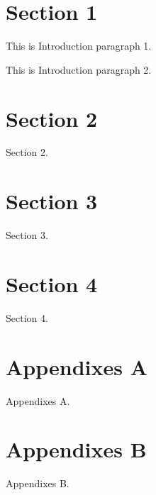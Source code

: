 \documentclass[%
 reprint,
 amsmath,amssymb,
 aps,
]{revtex4-2}
\begin{document}

\section{Section 1}

This is Introduction paragraph 1.

This is Introduction paragraph 2.

\section{Section 2}
Section 2.

\section{Section 3}
Section 3.

\section{Section 4}
Section 4.

\appendix

\section{Appendixes A}

Appendixes A.

\section{Appendixes B}

Appendixes B.

\nocite{*}

\end{document}
